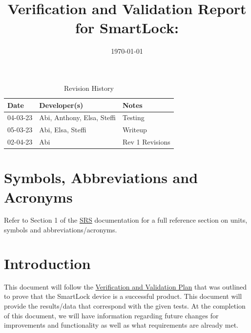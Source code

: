 \documentclass[12pt, titlepage]{article}
\begin{document}
\title{Verification and Validation Report for SmartLock: \progname} 
\author{\authname}
\date{\today}
	
\maketitle


\begin{table}[hp]
\caption{Revision History} \label{TblRevisionHistory}
\begin{tabularx}{\textwidth}{p{2cm}p{5cm}X}
\toprule {\bf Date} & {\bf Developer(s)} & {\bf Notes}\\
\midrule
04-03-23& Abi, Anthony, Elsa, Steffi & Testing\\
05-03-23& Abi, Elsa, Steffi & Writeup\\
02-04-23 & Abi & Rev 1 Revisions\\
\bottomrule
\end{tabularx}
\end{table}



\newpage

\tableofcontents

\listoftables %

\listoffigures %

\newpage


\section{Symbols, Abbreviations and Acronyms}

Refer to Section 1 of the \href{https://github.com/NevoAbigail/Capstone/blob/main/docs/SRS/SRS.pdf}{SRS} documentation for a full reference section on units, symbols and abbreviations/acronyms.

\section{Introduction}

This document will follow the \href{https://github.com/NevoAbigail/Capstone/blob/main/docs/VnVPlan/VnVPlan.pdf}{Verification and Validation Plan} that was outlined to prove that the SmartLock device is a successful product. This document will provide the results/data that correspond with the given tests. At the completion of this document, we will have information regarding future changes for improvements and functionality as well as what requirements are already met. 
\end{document}
